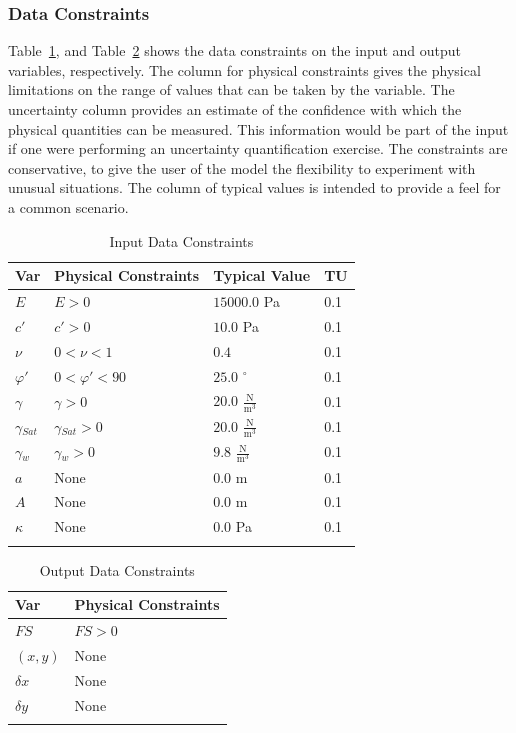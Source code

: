 \documentclass[12pt]{article}
\begin{document}
\subsubsection{Data Constraints}
\label{Sec:DataConstraints}
Table~\ref{Table:InDataConstraints}, and Table~\ref{Table:OutDataConstraints} shows the data constraints on the input and output variables, respectively. The column for physical constraints gives the physical limitations on the range of values that can be taken by the variable. The uncertainty column provides an estimate of the confidence with which the physical quantities can be measured. This information would be part of the input if one were performing an uncertainty quantification exercise. The constraints are conservative, to give the user of the model the flexibility to experiment with unusual situations. The column of typical values is intended to provide a feel for a common scenario.
\begin{longtable}{l l l l}
\toprule
Var & Physical Constraints & Typical Value & TU
\\
\midrule
$E$ & $E>0$ & $15000.0$ Pa & 0.1
\\
$c'$ & $c'>0$ & $10.0$ Pa & 0.1
\\
$\nu{}$ & $0<\nu{}<1$ & $0.4$ & 0.1
\\
$\varphi{}'$ & $0<\varphi{}'<90$ & $25.0$ ${}^{\circ}$ & 0.1
\\
$\gamma{}$ & $\gamma{}>0$ & $20.0$ $\frac{\text{N}}{\text{m}^{3}}$ & 0.1
\\
${\gamma{}_{Sat}}$ & ${\gamma{}_{Sat}}>0$ & $20.0$ $\frac{\text{N}}{\text{m}^{3}}$ & 0.1
\\
${\gamma{}_{w}}$ & ${\gamma{}_{w}}>0$ & $9.8$ $\frac{\text{N}}{\text{m}^{3}}$ & 0.1
\\
$a$ & None & $0.0$ m & 0.1
\\
$A$ & None & $0.0$ m & 0.1
\\
$\kappa{}$ & None & $0.0$ Pa & 0.1
\\
\bottomrule
\caption{Input Data Constraints}
\label{Table:InDataConstraints}
\end{longtable}
\begin{longtable}{l l}
\toprule
Var & Physical Constraints
\\
\midrule
$FS$ & $FS>0$
\\
$(x,y)$ & None
\\
$\delta{}x$ & None
\\
$\delta{}y$ & None
\\
\bottomrule
\caption{Output Data Constraints}
\label{Table:OutDataConstraints}
\end{longtable}
\end{document}
